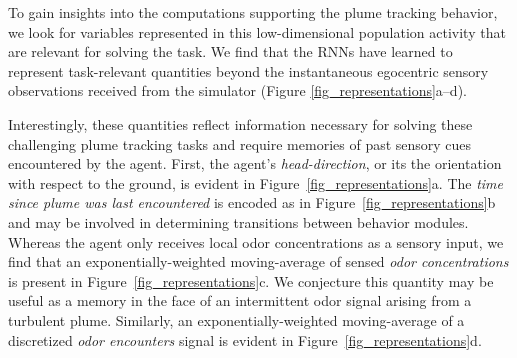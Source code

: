 \documentclass[5p,twocolumn,authoryear]{elsarticle}
\begin{document}
To gain insights into the computations supporting the plume tracking behavior, we look for variables represented in this low-dimensional population activity that are relevant for solving the task. 
We find that the RNNs have learned to represent task-relevant quantities beyond the instantaneous egocentric sensory observations received from the simulator (Figure \ref{fig_representations}a--d).

Interestingly, these quantities reflect information necessary for solving these challenging plume tracking tasks and require memories of past sensory cues encountered by the agent.
First, the agent's \textit{head-direction}, or its the orientation with respect to the ground, is evident in Figure~\ref{fig_representations}a.
The \textit{time since plume was last encountered} is encoded as in Figure~\ref{fig_representations}b and may be involved in determining transitions between behavior modules.
Whereas the agent only receives local odor concentrations as a sensory input, we find that an exponentially-weighted moving-average of sensed \textit{odor concentrations} is present in Figure~\ref{fig_representations}c.
We conjecture this quantity may be useful as a memory in the face of an intermittent odor signal arising from a turbulent plume.
Similarly, an exponentially-weighted moving-average of a discretized \textit{odor encounters} signal is evident in Figure~\ref{fig_representations}d.
\end{document}
